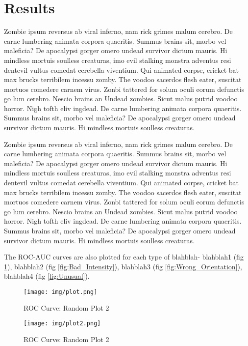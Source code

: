 \documentclass[11pt]{article}
\begin{document}
\section{Results}


Zombie ipsum reversus ab viral inferno, nam rick grimes malum cerebro. De carne lumbering animata corpora quaeritis. Summus brains sit, morbo vel maleficia? De apocalypsi gorger omero undead survivor dictum mauris. Hi mindless mortuis soulless creaturas, imo evil stalking monstra adventus resi dentevil vultus comedat cerebella viventium. Qui animated corpse, cricket bat max brucks terribilem incessu zomby. The voodoo sacerdos flesh eater, suscitat mortuos comedere carnem virus. Zonbi tattered for solum oculi eorum defunctis go lum cerebro. Nescio brains an Undead zombies. Sicut malus putrid voodoo horror. Nigh tofth eliv ingdead. De carne lumbering animata corpora quaeritis. Summus brains sit, morbo vel maleficia? De apocalypsi gorger omero undead survivor dictum mauris. Hi mindless mortuis soulless creaturas.



Zombie ipsum reversus ab viral inferno, nam rick grimes malum cerebro. De carne lumbering animata corpora quaeritis. Summus brains sit, morbo vel maleficia? De apocalypsi gorger omero undead survivor dictum mauris. Hi mindless mortuis soulless creaturas, imo evil stalking monstra adventus resi dentevil vultus comedat cerebella viventium. Qui animated corpse, cricket bat max brucks terribilem incessu zomby. The voodoo sacerdos flesh eater, suscitat mortuos comedere carnem virus. Zonbi tattered for solum oculi eorum defunctis go lum cerebro. Nescio brains an Undead zombies. Sicut malus putrid voodoo horror. Nigh tofth eliv ingdead. De carne lumbering animata corpora quaeritis. Summus brains sit, morbo vel maleficia? De apocalypsi gorger omero undead survivor dictum mauris. Hi mindless mortuis soulless creaturas.

The ROC-AUC curves are also plotted for each type of blahblah- blahblah1 (fig \ref{fig:Bad_Positioning}), blahblah2 (fig \ref{fig:Bad_Intensity}), blahblah3 (fig \ref{fig:Wrong_Orientation}), blahblah4 (fig \ref{fig:Unusual}).

\begin{figure}[H]
  \centering
  \begin{minipage}[b]{0.4\textwidth}
    \texttt{[image: img/plot.png]}
    \caption{ROC Curve: Random Plot 2}
    \label{fig:Bad_Intensity}
  \end{minipage}
  \hfill
  \begin{minipage}[b]{0.4\textwidth}
    \texttt{[image: img/plot2.png]}
    \caption{ROC Curve: Random Plot 2}
    \label{fig:Bad_Positioning}
  \end{minipage}
\end{figure}
\end{document}
